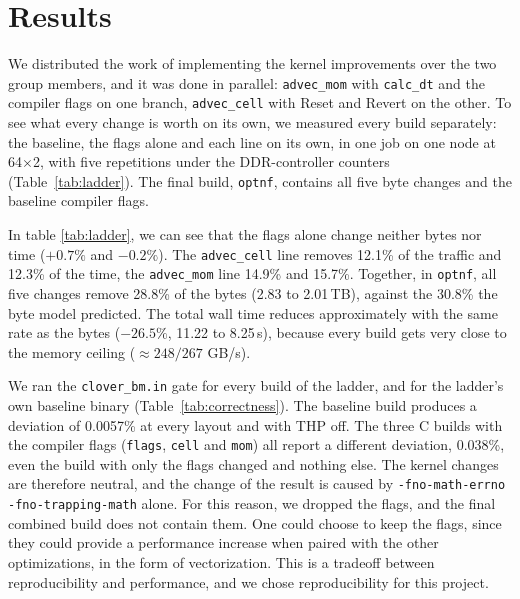 \documentclass[a4paper,11pt]{article}
\newcommand{\kernel}[1]{\texttt{#1}}
\begin{document}
\section{Results}
\label{sec:res}
We distributed the work of implementing the kernel improvements over the two group members, and it was done in parallel: \kernel{advec\_mom} with \kernel{calc\_dt} and the compiler flags on one branch, \kernel{advec\_cell} with Reset and Revert on the other.
To see what every change is worth on its own, we measured every build separately: the baseline, the flags alone and each line on its own, in one job on one node at 64$\times$2, with five repetitions under the DDR-controller counters (Table~\ref{tab:ladder}).
The final build, \texttt{optnf}, contains all five byte changes and the baseline compiler flags.

In table \ref{tab:ladder}, we can see that the flags alone change neither bytes nor time ($+0.7\%$ and $-0.2\%$).
The \kernel{advec\_cell} line removes 12.1\% of the traffic and 12.3\% of the time, the \kernel{advec\_mom} line 14.9\% and 15.7\%.
Together, in \texttt{optnf}, all five changes remove 28.8\% of the bytes (2.83 to 2.01\,TB), against the 30.8\% the byte model predicted.
The total wall time reduces approximately with the same rate as the bytes ($-26.5\%$, 11.22 to 8.25\,s), because every build gets very close to the memory ceiling ($\approx 248/267$ GB/s).

\begin{table}[htbp]
  \centering\small
  
  \caption{Per-change attribution at 64$\times$2. The builds were run on bm3840, with five repetitions under the DDR-controller counters. Each build is compared against the baseline build of the same job. \texttt{flags}, \texttt{cell} and \texttt{mom} include the (T2) flags. The final build \texttt{optnf} does not, and was measured later against a baseline rerun of its own (11.22\,s).}
  \label{tab:ladder}
\end{table}

We ran the \texttt{clover\_bm.in} gate for every build of the ladder, and for the ladder's own baseline binary (Table~\ref{tab:correctness}).
The baseline build produces a deviation of 0.0057\% at every layout and with THP off.
The three C builds with the compiler flags (\texttt{flags}, \texttt{cell} and \texttt{mom}) all report a different deviation, 0.038\%, even the build with only the flags changed and nothing else.
The kernel changes are therefore neutral, and the change of the result is caused by \texttt{-fno-math-errno -fno-trapping-math} alone.
For this reason, we dropped the flags, and the final combined build does not contain them.
One could choose to keep the flags, since they could provide a performance increase when paired with the other optimizations, in the form of vectorization. This is a tradeoff between reproducibility and performance, and we chose reproducibility for this project.
\end{document}
